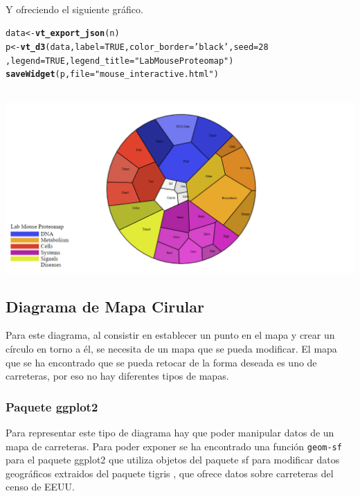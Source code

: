 \documentclass{article}\usepackage[]{graphicx}\usepackage[]{color}
\makeatletter
\newcommand{\hlnum}[1]{\textcolor[rgb]{0.686,0.059,0.569}{#1}}%
\newcommand{\hlstr}[1]{\textcolor[rgb]{0.192,0.494,0.8}{#1}}%
\newcommand{\hlstd}[1]{\textcolor[rgb]{0.345,0.345,0.345}{#1}}%
\newcommand{\hlkwb}[1]{\textcolor[rgb]{0.69,0.353,0.396}{#1}}%
\newcommand{\hlkwc}[1]{\textcolor[rgb]{0.333,0.667,0.333}{#1}}%
\newcommand{\hlkwd}[1]{\textcolor[rgb]{0.737,0.353,0.396}{\textbf{#1}}}%
\newenvironment{kframe}{%
 \def\at@end@of@kframe{}%
 \ifinner\ifhmode%
  \def\at@end@of@kframe{\end{minipage}}%
  \begin{minipage}{\columnwidth}%
 \fi\fi%
 \def\FrameCommand##1{\hskip\@totalleftmargin \hskip-\fboxsep
 \colorbox{shadecolor}{##1}\hskip-\fboxsep
     \hskip-\linewidth \hskip-\@totalleftmargin \hskip\columnwidth}%
 \MakeFramed {\advance\hsize-\width
   \@totalleftmargin\z@ \linewidth\hsize
   \@setminipage}}%
 {\par\unskip\endMakeFramed%
 \at@end@of@kframe}
\newenvironment{knitrout}{}{} %
\makeatother
\begin{document}
~\\
Y ofreciendo el siguiente gr\'afico.
\begin{knitrout}
\color{fgcolor}\begin{kframe}
\begin{alltt}
\hlstd{data}\hlkwb{<-}\hlkwd{vt_export_json}\hlstd{(n)}
\hlstd{p} \hlkwb{<-} \hlkwd{vt_d3}\hlstd{(data,} \hlkwc{label} \hlstd{=} \hlnum{TRUE}\hlstd{,}\hlkwc{color_border} \hlstd{=} \hlstr{'black'}\hlstd{,} \hlkwc{seed} \hlstd{=} \hlnum{28}
      \hlstd{,} \hlkwc{legend} \hlstd{=} \hlnum{TRUE}\hlstd{,} \hlkwc{legend_title} \hlstd{=} \hlstr{"Lab Mouse Proteomap"}\hlstd{)}
\hlkwd{saveWidget}\hlstd{(p,} \hlkwc{file} \hlstd{=} \hlstr{"mouse_interactive.html"}\hlstd{)}
\end{alltt}
\end{kframe}
\end{knitrout}
~\\
\vbox{
    \centering
    \includegraphics[width=1.2\textwidth]{imag/mouse_interactive}
}
\clearpage
\subsection{Diagrama de Mapa Cirular}\label{ssec:carretera}
Para este diagrama, al consistir en establecer un punto en el mapa y crear un c\'irculo en torno a \'el, se necesita de un mapa que se pueda modificar. El mapa que se ha encontrado que se pueda retocar de la forma deseada es uno de carreteras, por eso no hay diferentes tipos de mapas.
\subsubsection{Paquete ggplot2}
Para representar este tipo de diagrama hay que poder manipular datos de un mapa de carreteras. Para poder exponer se ha encontrado una funci\'on \texttt{geom-sf} para el paquete ggplot2 %
que utiliza objetos del paquete sf para modificar datos geogr\'aficos extraidos del paquete tigris %
, que ofrece datos sobre carreteras del censo de EEUU.  
\end{document}
